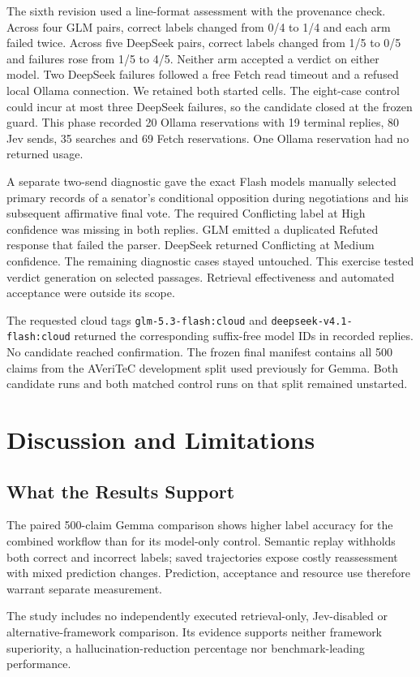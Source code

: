 \documentclass[conference]{IEEEtran}
\begin{document}
The sixth revision used a line-format assessment with the provenance check. Across four GLM pairs, correct labels changed from 0/4 to 1/4 and each arm failed twice. Across five DeepSeek pairs, correct labels changed from 1/5 to 0/5 and failures rose from 1/5 to 4/5. Neither arm accepted a verdict on either model. Two DeepSeek failures followed a free Fetch read timeout and a refused local Ollama connection. We retained both started cells. The eight-case control could incur at most three DeepSeek failures, so the candidate closed at the frozen guard. This phase recorded 20 Ollama reservations with 19 terminal replies, 80 Jev sends, 35 searches and 69 Fetch reservations. One Ollama reservation had no returned usage.

A separate two-send diagnostic gave the exact Flash models manually selected primary records of a senator's conditional opposition during negotiations and his subsequent affirmative final vote. The required Conflicting label at High confidence was missing in both replies. GLM emitted a duplicated Refuted response that failed the parser. DeepSeek returned Conflicting at Medium confidence. The remaining diagnostic cases stayed untouched. This exercise tested verdict generation on selected passages. Retrieval effectiveness and automated acceptance were outside its scope.

The requested cloud tags \texttt{glm-5.3-flash:cloud} and \texttt{deepseek-v4.1-flash:cloud} returned the corresponding suffix-free model IDs in recorded replies. No candidate reached confirmation. The frozen final manifest contains all 500 claims from the AVeriTeC development split used previously for Gemma. Both candidate runs and both matched control runs on that split remained unstarted.

\section{Discussion and Limitations}
\subsection{What the Results Support}
The paired 500-claim Gemma comparison shows higher label accuracy for the combined workflow than for its model-only control. Semantic replay withholds both correct and incorrect labels; saved trajectories expose costly reassessment with mixed prediction changes. Prediction, acceptance and resource use therefore warrant separate measurement.

The study includes no independently executed retrieval-only, Jev-disabled or alternative-framework comparison. Its evidence supports neither framework superiority, a hallucination-reduction percentage nor benchmark-leading performance.
\end{document}
